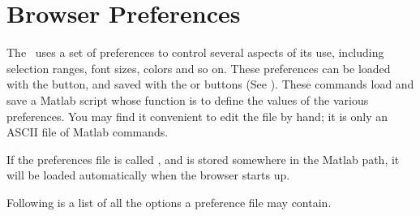\section{Browser Preferences}
\label{gui,ref,options}

The \GUI\ uses a set of preferences to control several aspects of its
use, including selection ranges, font sizes, colors and so on.  These
preferences can be loaded with the 
button, and saved with the  or  buttons
(See ).  These commands load and save a
Matlab script whose function is to define the values of the various
preferences.  You may find it convenient to edit the file by hand; it
is only an ASCII file of Matlab commands.

If the preferences file is called , and is stored
somewhere in the Matlab path, it will be loaded automatically when the
browser starts up.

Following is a list of all the options a preference file may contain.

